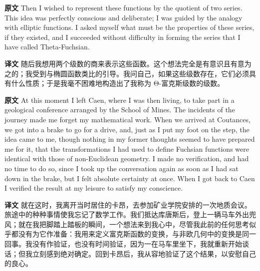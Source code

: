 \documentclass[UTF8]{ctexart}
\newenvironment{english}{\par\small\noindent\textbf{原文}\quad\ignorespaces}{\par}
\newenvironment{zhtranslation}{\par\noindent\textbf{译文}\quad\ignorespaces}{\par\vspace{0.35em}}
\begin{document}
\begin{english}
Then I wished to represent these functions by the quotient of two series. This idea was perfectly conscious and deliberate; I was guided by the analogy with elliptic functions. I asked myself what must be the properties of these series, if they existed, and I succeeded without difficulty in forming the series that I have called Theta-Fuchsian.
\end{english}
\begin{zhtranslation}
随后我想用两个级数的商来表示这些函数。这个想法完全是有意识且有意为之的；我受到与椭圆函数类比的引导。我问自己，如果这些级数存在，它们必须具有什么性质；于是我毫不困难地构造出了我称为 Θ-富克斯级数的级数。\end{zhtranslation}

\begin{english}
At this moment I left Caen, where I was then living, to take part in a geological conference arranged by the School of Mines. The incidents of the journey made me forget my mathematical work. When we arrived at Coutances, we got into a brake to go for a drive, and, just as I put my foot on the step, the idea came to me, though nothing in my former thoughts seemed to have prepared me for it, that the transformations I had used to define Fuchsian functions were identical with those of non-Euclidean geometry. I made no verification, and had no time to do so, since I took up the conversation again as soon as I had sat down in the brake, but I felt absolute certainty at once. When I got back to Caen I verified the result at my leisure to satisfy my conscience.
\end{english}
\begin{zhtranslation}
就在这时，我离开当时居住的卡昂，去参加矿业学院安排的一次地质会议。旅途中的种种事情使我忘记了数学工作。我们抵达库唐斯后，登上一辆马车外出兜风；就在我把脚踏上踏板的瞬间，一个想法来到我心中，尽管我此前的任何思考似乎都没有为它作准备：我用来定义富克斯函数的变换，与非欧几何中的变换是同一回事。我没有作验证，也没有时间验证，因为一在马车里坐下，我就重新开始谈话；但我立刻感到绝对确定。回到卡昂后，我从容地验证了这个结果，以安慰自己的良心。\end{zhtranslation}
\end{document}
